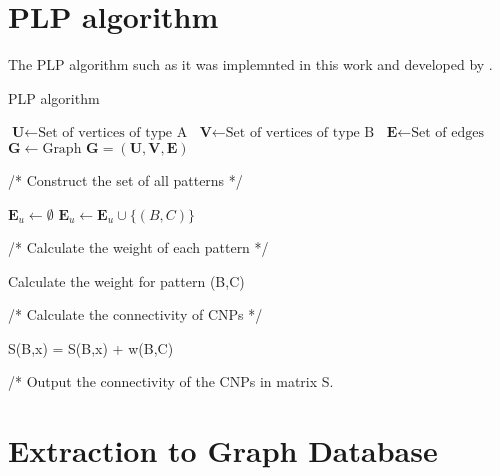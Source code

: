 \chapter{PLP algorithm}\label{ap:plp}
The PLP algorithm such as it was implemnted in this work and developed by \citet{plp}.


\makeatletter
\def\BState{\State\hskip-\ALG@thistlm}
\makeatother

\begin{algorithm}
\caption{PLP algorithm}

\begin{algorithmic}

\State $ \textbf{U} \gets \text{Set of vertices of type A}$
\State $ \textbf{V} \gets \text{Set of vertices of type B}$
\State $ \textbf{E} \gets \text{Set of edges}$
\State $ \textbf{G} \gets \text{Graph }\textbf{G}=(\textbf{U},\textbf{V},\textbf{E})$

\State /* Construct the set of all patterns */

\State $ \textbf{E}_u \gets \emptyset$
            \State $\textbf{E}_u \gets \textbf{E}_u \cup \{(B,C)\}$
        \EndFor
    \EndFor
\EndFor

\State /* Calculate the weight of each pattern */

    \State Calculate the weight for pattern (B,C)
\EndFor

\State /* Calculate the connectivity of CNPs */

                \State S(B,x) = S(B,x) + w(B,C)
            \EndIf
        \EndFor
    \EndFor
\EndFor

\State /* Output the connectivity of the CNPs in matrix S.

\end{algorithmic}
\end{algorithm}

\newpage

\chapter{Extraction to Graph Database}\label{ap:query}

